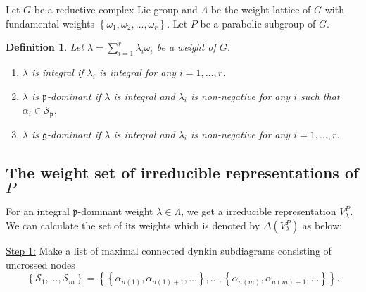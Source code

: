 \documentclass[uplatex,dvipdfmx]{jsarticle}
\newtheorem{definition}{Definition}[section]
\begin{document}
Let
$G$
be a reductive complex Lie group and
$\Lambda$
be the weight lattice of
$G$
with fundamental weights
$\left\{ \omega_1, \omega_2, \ldots, \omega_r \right\}$.
Let
$P$
be a parabolic subgroup of
$G$.

\begin{definition}
    Let 
    $\lambda = \sum_{i = 1}^r \lambda_i \omega_i$ 
    be a weight of
    $G$.
    \begin{enumerate}
        \item
            $\lambda$
            is
            \textit{integral} 
            if
            $\lambda_i$
            is integral for any
            $i = 1, \ldots, r$.
        \item 
            $\lambda$
            is
            $\mathfrak{p}$\textit{-dominant} 
            if
            $\lambda$
            is integral and
            $\lambda_i$
            is non-negative for any
            $i$
            such that
            $\alpha_i \in \mathcal{S}_\mathfrak{p}$.
        \item 
            $\lambda$
            is
            $\mathfrak{g}$\textit{-dominant} 
            if
            $\lambda$
            is integral and
            $\lambda_i$
            is non-negative for any
            $i = 1, \ldots, r$.
    \end{enumerate}
\end{definition}

\subsection{The weight set of irreducible representations of $P$}

For an integral
$\mathfrak{p}$-dominant
weight
$\lambda \in \Lambda$,
we get a irreducible representation
$V_\lambda^P$.
We can calculate the set of its weights which is denoted by
$\Delta(V_\lambda^P)$ as below:

\underline{Step 1:}
Make a list of maximal connected dynkin subdiagrams consisting of uncrossed nodes
\begin{equation}
    \left\{ 
        \mathcal{S}_1, 
        \ldots, 
        \mathcal{S}_m 
    \right\}
    =
    \left\{
        \left\{ \alpha_{n(1)}, \alpha_{n(1)+1}, \ldots \right\},
        \ldots, 
        \left\{ \alpha_{n(m)}, \alpha_{n(m)+1}, \ldots \right\} 
    \right\}.
\end{equation}
\end{document}
